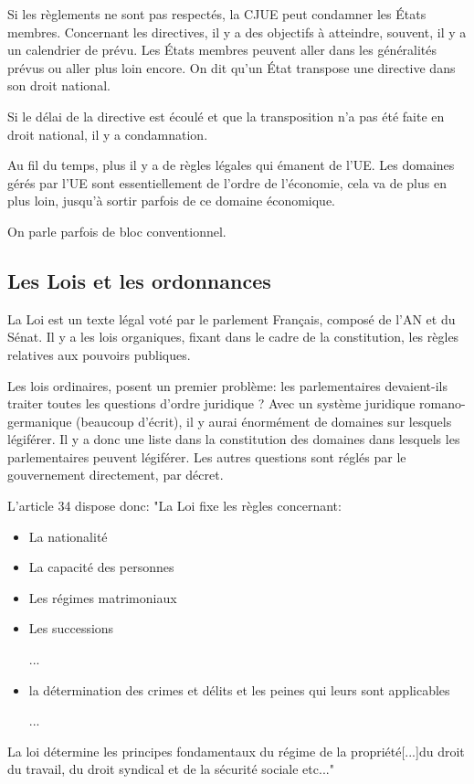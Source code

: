 \documentclass[12pt, a4paper, openany]{book}
\begin{document}
Si les règlements ne sont pas respectés, la CJUE peut condamner les États membres. Concernant les directives, il y a des objectifs à atteindre, souvent, il y a un calendrier de prévu. Les États membres peuvent aller dans les généralités prévus ou aller plus loin encore. On dit qu'un État transpose une directive dans son droit national.

Si le délai de la directive est écoulé et que la transposition n'a pas été faite en droit national, il y a condamnation.

Au fil du temps, plus il y a de règles légales qui émanent de l'UE. Les domaines gérés par l'UE sont essentiellement de l'ordre de l'économie, cela va de plus en plus loin, jusqu'à sortir parfois de ce domaine économique.

On parle parfois de bloc conventionnel. 

\subsection{Les Lois et les ordonnances}

La Loi est un texte légal voté par le parlement Français, composé de l'AN et du Sénat. Il y a les lois organiques, fixant dans le cadre de la constitution, les règles relatives aux pouvoirs publiques.

Les lois ordinaires, posent un premier problème: les parlementaires devaient-ils traiter toutes les questions d'ordre juridique ? Avec un système juridique romano-germanique (beaucoup d'écrit), il y aurai énormément de domaines sur lesquels légiférer. Il y a donc une liste dans la constitution des domaines dans lesquels les parlementaires peuvent légiférer. Les autres questions sont réglés par le gouvernement directement, par décret.

L'article 34 dispose donc: "La Loi fixe les règles concernant:
\begin{itemize}
\item La nationalité
\item La capacité des personnes
\item Les régimes matrimoniaux
\item Les successions
\item [...]
\item la détermination des crimes et délits et les peines qui leurs sont applicables
\item [...]
\end{itemize}
La loi détermine les principes fondamentaux du régime de la propriété[...]du droit du travail, du droit syndical et de la sécurité sociale etc..."
\end{document}
